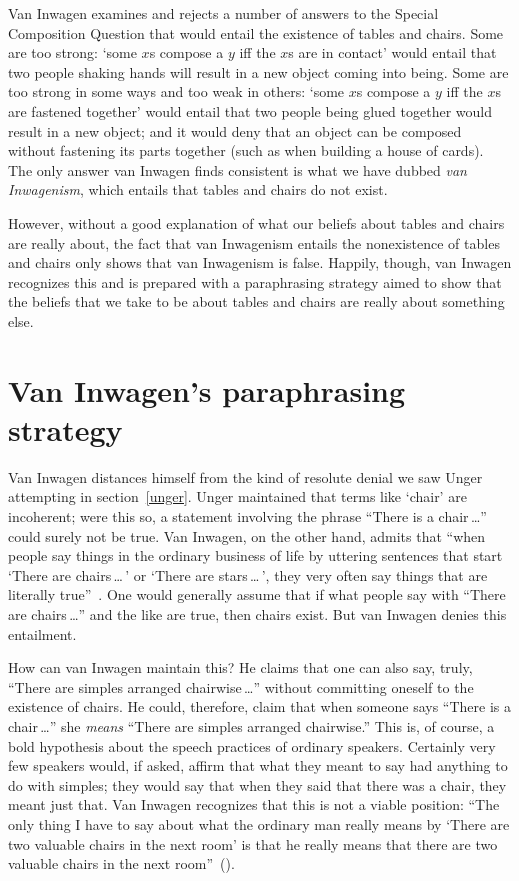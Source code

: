 \documentclass[11pt]{article}
\begin{document}
\begin{spacing}{1.5}
Van Inwagen examines and rejects a number of answers to the Special Composition Question that would entail the existence of tables and chairs. Some are too strong: `some $x$s compose a $y$ iff the $x$s are in contact' would entail that two people shaking hands will result in a new object coming into being. Some are too strong in some ways and too weak in others: `some $x$s compose a $y$ iff the $x$s are fastened together' would entail that two people being glued together would result in a new object; and it would deny that an object can be composed without fastening its parts together (such as when building a house of cards). The only answer van Inwagen finds consistent is what we have dubbed {\em van Inwagenism}, which entails that tables and chairs do not exist.

However, without a good explanation of what our beliefs about tables and chairs are really about, the fact that van Inwagenism entails the nonexistence of tables and chairs only shows that van Inwagenism is false. Happily, though, van Inwagen recognizes this and is prepared with a paraphrasing strategy aimed to show that the beliefs that we take to be about tables and chairs are really about something else.

\section{Van Inwagen's paraphrasing strategy}
\label{pigletwise}
Van Inwagen distances himself from the kind of resolute denial we saw Unger attempting in section~\ref{unger}. Unger maintained that terms like `chair' are incoherent; were this so, a statement involving the phrase ``There is a chair\,\ldots '' could surely not be true. Van Inwagen, on the other hand, admits that ``when people say things in the ordinary business of life by uttering sentences that start `There are chairs\,\ldots\,' or `There are stars\,\ldots\,', they very often say things that are literally true''~\cite[102]{inwagen1995}. One would generally assume that if what people say with ``There are chairs\,\ldots '' and the like are true, then chairs exist. But van Inwagen denies this entailment.

How can van Inwagen maintain this? He claims that one can also say, truly, ``There are simples arranged chairwise\,\ldots '' without committing oneself to the existence of chairs. He could, therefore, claim that when someone says ``There is a chair\,\ldots '' she {\em means} ``There are simples arranged chairwise.'' This is, of course, a bold hypothesis about the speech practices of ordinary speakers. Certainly very few speakers would, if asked, affirm that what they meant to say had anything to do with simples; they would say that when they said that there was a chair, they meant just that. Van Inwagen recognizes that this is not a viable position: ``The only thing I have to say about what the ordinary man really means by `There are two valuable chairs in the next room' is that he really means that there are two valuable chairs in the next room''~(\citeyear[106]{inwagen1995}).


\end{spacing}
\end{document}
